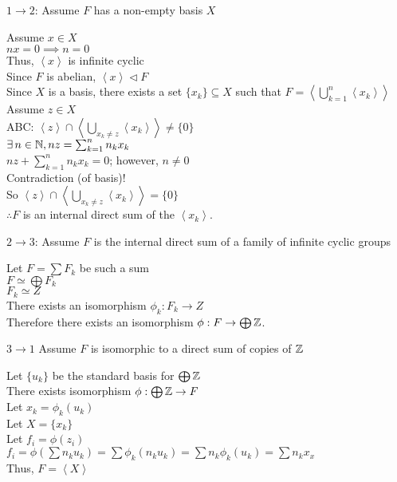 \documentclass[letterpaper,12pt,fleqn]{article}
\newcommand{\cycle}[1]{\left<#1\right>}
\newcommand{\n}{\mathrel{\triangleleft}}
\begin{document}
\begin{theproof}
  \listbreak
  \begin{description}
  \item $1\to 2$: Assume $F$ has a non-empty basis $X$

    Assume $x\in X$ \\
    $nx=0\implies n=0$ \\
    Thus, $\cycle{x}$ is infinite cyclic \\
    Since $F$ is abelian, $\cycle{x}\n F$ \\
    Since $X$ is a basis, there exists a set $\{x_k\}\subseteq X$ such that
    $F=\cycle{\bigcup_{k=1}^n\cycle{x_k}}$ \\
    Assume $z\in X$ \\
    ABC: $\cycle{z}\cap\cycle{\bigcup_{x_k\ne z}\cycle{x_k}}\ne\{0\}$ \\
    $\exists\,n\in\mathbb{N},nz=\sum_{k=1}^n{n_kx_k}$ \\
    $nz+\sum_{k=1}^n{n_kx_k}=0$; however, $n\ne0$ \\
    Contradiction (of basis)! \\
    So $\cycle{z}\cap\cycle{\bigcup_{x_k\ne z}\cycle{x_k}}=\{0\}$ \\
    $\therefore F$ is an internal direct sum of the $\cycle{x_k}$.

  \item $2\to 3$: Assume $F$ is the internal direct sum of a family of
    infinite cyclic groups

    Let $F=\sum F_k$ be such a sum \\
    $F\simeq\bigoplus F_k$ \\
    $F_k\simeq Z$ \\
    There exists an isomorphism $\phi_k:F_k\to Z$ \\
    Therefore there exists an isomorphism $\phi:F\to\bigoplus\mathbb{Z}$.

  \item $3\to 1$ Assume $F$ is isomorphic to a direct sum of copies of $\mathbb{Z}$

    Let $\{u_k\}$ be the standard basis for $\bigoplus\mathbb{Z}$ \\
    There exists isomorphism $\phi:\bigoplus\mathbb{Z}\to F$ \\
    Let $x_k=\phi_k(u_k)$ \\
    Let $X=\{x_k\}$ \\
    Let $f_i=\phi(z_i)$ \\
    $f_i=\phi(\sum n_ku_k)=\sum\phi_k(n_ku_k)=\sum n_k\phi_k(u_k)=\sum n_kx_x$ \\
    Thus, $F=\cycle{X}$


\end{description}
\end{theproof}
\end{document}

